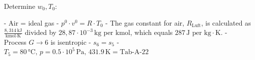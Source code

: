 Determine \( w_0, T_0 \):

- Air = ideal gas
- \( p^0 \cdot v^0 = R \cdot T_0 \)
- The gas constant for air, \( R_{\text{Luft}} \), is calculated as \( \frac{8,314 \, \text{kJ}}{\text{kmol} \cdot \text{K}} \) divided by \( 28,87 \cdot 10^{-3} \, \text{kg} \text{ per kmol} \), which equals \( 287 \, \text{J} \text{ per kg} \cdot \text{K} \).
- Process \( G \rightarrow 6 \) is isentropic
- \( s_6 = s_5 \)
- \( T_5 = 80 \, \text{°C}, \, p = 0.5 \cdot 10^5 \, \text{Pa}, \, 431.9 \, \text{K} = \text{Tab-A-22} \)